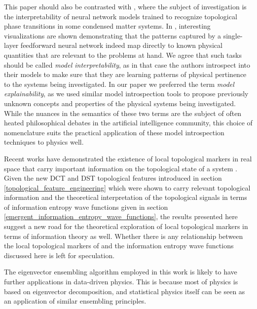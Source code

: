 \documentclass[10pt]{revtex4-1}
\begin{document}
This paper should also be contrasted with \cite{zhang2020interpreting}, where the subject of investigation is the interpretability of neural network models trained to recognize topological phase transitions in some condensed matter systems. In \cite{zhang2020interpreting}, interesting visualizations are shown demonstrating that the patterns captured by a single-layer feedforward neural network indeed map directly to known physical quantities that are relevant to the problems at hand. We agree that such tasks should be called \emph{model interpretability}, as in that case the authors introspect into their models to make sure that they are learning patterns of physical pertinence to the systems being investigated. In our paper we preferred the term \emph{model explainability}, as we used similar model introspection tools to propose previously unknown concepts and properties of the physical systems being investigated. While the nuances in the semantics of these two terms are the subject of often heated philosophical debates in the artificial intelligence community, this choice of nomenclature suits the practical application of these model introspection techniques to physics well.

Recent works have demonstrated the existence of local topological markers in real space that carry important information on the topological state of a system \cite{PhysRevB.84.241106,caio2019topological}. Given the new DCT and DST topological features introduced in section \ref{topological_feature_engineering} which were shown to carry relevant topological information and the theoretical interpretation of the topological signals in terms of information entropy wave functions given in section \ref{emergent_information_entropy_wave_functions}, the results presented here suggest a new road for the theoretical exploration of local topological markers in terms of information theory as well. Whether there is any relationship between the local topological markers of \cite{PhysRevB.84.241106,caio2019topological} and the information entropy wave functions discussed here is left for speculation.
 
The eigenvector ensembling algorithm employed in this work is likely to have further applications in data-driven physics. This is because most of physics is based on eigenvector decomposition, and statistical physics itself can be seen as an application of similar ensembling principles. 
\end{document}
